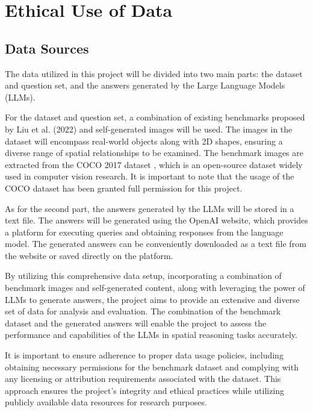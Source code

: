 \documentclass[twocolumn,11pt]{report}
\begin{document}

\chapter{Ethical Use of Data}\label{chap:ethics}

\section{Data Sources}
The data utilized in this project will be divided into two main parts: the dataset and question set, and the answers generated by the Large Language Models (LLMs).

For the dataset and question set, a combination of existing benchmarks proposed by Liu et al. (2022) \cite{liu2022visual} and self-generated images will be used. The images in the dataset will encompass real-world objects along with 2D shapes, ensuring a diverse range of spatial relationships to be examined. The benchmark images are extracted from the COCO 2017 dataset \cite{lin2014microsoft}, which is an open-source dataset widely used in computer vision research. It is important to note that the usage of the COCO dataset has been granted full permission for this project.

As for the second part, the answers generated by the LLMs will be stored in a text file. The answers will be generated using the OpenAI website, which provides a platform for executing queries and obtaining responses from the language model. The generated answers can be conveniently downloaded as a text file from the website or saved directly on the platform.

By utilizing this comprehensive data setup, incorporating a combination of benchmark images and self-generated content, along with leveraging the power of LLMs to generate answers, the project aims to provide an extensive and diverse set of data for analysis and evaluation. The combination of the benchmark dataset and the generated answers will enable the project to assess the performance and capabilities of the LLMs in spatial reasoning tasks accurately.

It is important to ensure adherence to proper data usage policies, including obtaining necessary permissions for the benchmark dataset and complying with any licensing or attribution requirements associated with the dataset. This approach ensures the project's integrity and ethical practices while utilizing publicly available data resources for research purposes.\\
\end{document}
